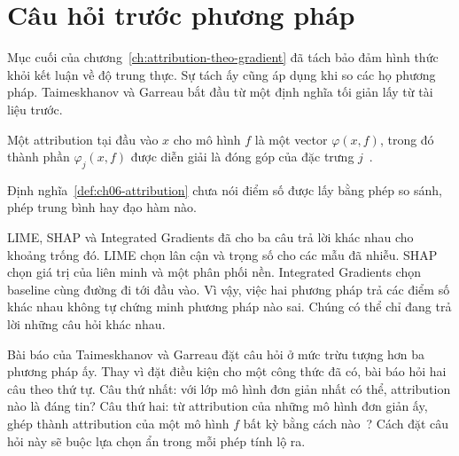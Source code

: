 \section{Câu hỏi trước phương pháp}
\label{sec:ch06-cau-hoi-truoc-phuong-phap}

%
Mục cuối của chương~\ref{ch:attribution-theo-gradient} đã tách bảo đảm hình
thức khỏi kết luận về độ trung thực. Sự tách ấy cũng áp dụng khi so các họ
phương pháp. Taimeskhanov và Garreau bắt đầu từ một định nghĩa tối giản lấy
từ tài liệu trước.

\begin{definition}
\label{def:ch06-attribution}
Một attribution tại đầu vào $x$ cho mô hình $f$ là một vector
$\varphi(x,f)$, trong đó thành phần $\varphi_j(x,f)$ được diễn giải là đóng
góp của đặc trưng $j$~\autocite{p17firstprinciples}.
\end{definition}

Định nghĩa~\ref{def:ch06-attribution} chưa nói điểm số được lấy bằng phép so
sánh, phép trung bình hay đạo hàm nào.

LIME, SHAP và Integrated Gradients đã cho ba câu trả lời khác nhau cho khoảng
trống đó. LIME chọn lân cận và trọng số cho các mẫu đã nhiễu. SHAP chọn giá trị
của liên minh và một phân phối nền. Integrated Gradients chọn baseline cùng
đường đi tới đầu vào. Vì vậy, việc hai phương pháp trả các điểm số khác nhau
không tự chứng minh phương pháp nào sai. Chúng có thể chỉ đang trả lời
những câu hỏi  khác nhau.

Bài báo của Taimeskhanov và Garreau đặt câu hỏi ở mức trừu tượng hơn ba
phương pháp ấy. Thay vì đặt
điều kiện cho một công thức đã có, bài báo hỏi hai câu theo thứ tự. Câu thứ
nhất: với lớp mô hình đơn giản nhất có thể, attribution nào là đáng tin? Câu
thứ hai: từ attribution của những mô hình đơn giản ấy, ghép thành attribution
của một mô hình $f$ bất kỳ bằng cách nào~\autocite{p17firstprinciples}? Cách
đặt câu hỏi này sẽ buộc lựa chọn ẩn trong mỗi phép tính lộ ra.
